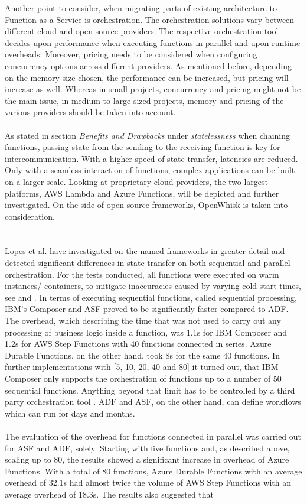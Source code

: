 \documentclass[a4paper,11pt, pagesize]{scrartcl}
\begin{document}
\begin{spacing}{1.2}
 Another point to consider, when migrating parts of existing architecture to Function as a Service is orchestration. The orchestration solutions vary between different cloud and open-source providers. The respective orchestration tool decides upon performance when executing functions in parallel and upon runtime overheads. Moreover, pricing needs to be considered when configuring concurrency options across different providers. As mentioned before, depending on the memory size chosen, the performance can be increased, but pricing will increase as well. Whereas in small projects, concurrency and pricing might not be the main issue, in medium to large-sized projects, memory and pricing of the various providers should be taken into account.\\\\ As stated in section \textit{Benefits and Drawbacks} under \textit{statelessness} when chaining functions, passing state from the sending to the receiving function is key for intercommunication. With a higher speed of state-transfer, latencies are reduced. Only with a seamless interaction of functions, complex applications can be built on a larger scale. Looking at proprietary cloud providers, the two largest platforms, AWS Lambda and Azure Functions,  will be depicted and further investigated. On the side of open-source frameworks, OpenWhisk is taken into consideration.\\\\\\ Lopes et al. have investigated on the named frameworks in greater detail and detected significant differences in state transfer on both sequential and parallel orchestration. For the tests conducted, all functions were executed on warm instances/ containers, to mitigate inaccuracies caused by varying cold-start times, see \cite{manner2018cold} and \cite{jackson2018investigation}. In terms of executing sequential functions, called sequential processing, IBM's Composer and ASF proved to be significantly faster compared to ADF. The overhead, which describing the time that was not used to carry out any processing of business logic inside a function, was 1.1s for IBM Composer and 1.2s for AWS Step Functions with 40 functions connected in series. Azure Durable Functions, on the other hand, took 8s for the same 40 functions. In further implementations with [5, 10, 20, 40 and 80] it turned out, that IBM Composer only supports the orchestration of functions up to a number of 50 sequential functions. Anything beyond that limit has to be controlled by a third party orchestration tool \cite{lopez2018comparison}. ADF and ASF, on the other hand, can define workflows which can run for days and months.\\\\ The evaluation of the overhead for functions connected in parallel was carried out for ASF and ADF, solely. Starting with five functions and, as described above, scaling up to 80, the results showed a significant increase in overhead of Azure Functions. With a total of 80 functions, Azure Durable Functions with an average overhead of 32.1s had almost twice the volume of AWS Step Functions with an average overhead of 18.3s. The results also suggested that 
\end{spacing}
\end{document}
